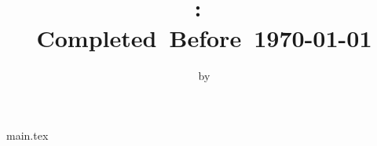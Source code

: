 \documentclass[11pt,a4]{article}
\title{
    \vspace{2in}
    \textmd{\textbf{\hmwkClass:\ \hmwkTitle}}\\
    \normalsize\vspace{0.1in}\small{Completed\ Before\ \today}\\
}
\author{by \hmwkAuthorName}
\date{}
\begin{document}
\maketitle
\pagebreak

{main.tex}
\end{document}
